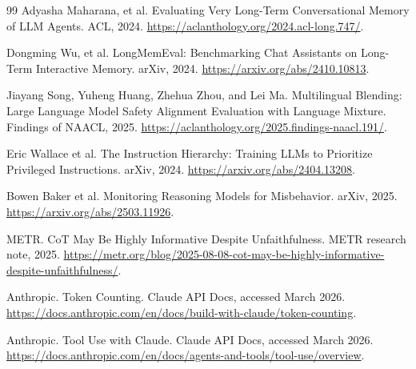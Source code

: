\documentclass[11pt]{article}
\begin{document}
\begin{thebibliography}{99}
Adyasha Maharana, et al.
\newblock Evaluating Very Long-Term Conversational Memory of LLM Agents.
\newblock ACL, 2024.
\newblock \url{https://aclanthology.org/2024.acl-long.747/}.

Dongming Wu, et al.
\newblock LongMemEval: Benchmarking Chat Assistants on Long-Term Interactive Memory.
\newblock arXiv, 2024.
\newblock \url{https://arxiv.org/abs/2410.10813}.

Jiayang Song, Yuheng Huang, Zhehua Zhou, and Lei Ma.
\newblock Multilingual Blending: Large Language Model Safety Alignment Evaluation with Language Mixture.
\newblock Findings of NAACL, 2025.
\newblock \url{https://aclanthology.org/2025.findings-naacl.191/}.

Eric Wallace et al.
\newblock The Instruction Hierarchy: Training LLMs to Prioritize Privileged Instructions.
\newblock arXiv, 2024.
\newblock \url{https://arxiv.org/abs/2404.13208}.

Bowen Baker et al.
\newblock Monitoring Reasoning Models for Misbehavior.
\newblock arXiv, 2025.
\newblock \url{https://arxiv.org/abs/2503.11926}.

METR.
\newblock CoT May Be Highly Informative Despite Unfaithfulness.
\newblock METR research note, 2025.
\newblock \url{https://metr.org/blog/2025-08-08-cot-may-be-highly-informative-despite-unfaithfulness/}.

Anthropic.
\newblock Token Counting.
\newblock Claude API Docs, accessed March 2026.
\newblock \url{https://docs.anthropic.com/en/docs/build-with-claude/token-counting}.

Anthropic.
\newblock Tool Use with Claude.
\newblock Claude API Docs, accessed March 2026.
\newblock \url{https://docs.anthropic.com/en/docs/agents-and-tools/tool-use/overview}.

\end{thebibliography}
\end{document}
